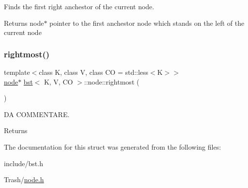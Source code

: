 Finds the first right anchestor of the current node. 

\begin{DoxyReturn}{Returns}
node$\ast$ pointer to the first anchestor node which stands on the left of the current node 
\end{DoxyReturn}
\mbox{\label{structbst_1_1node_ad76e8929422404ad9dd2459ccbc9ee7d}} 
\subsubsection{\texorpdfstring{rightmost()}{rightmost()}}
{\footnotesize\ttfamily template$<$class K, class V, class CO = std\+::less$<$\+K$>$$>$ \\
\hyperlink{structbst_1_1node}{node}$\ast$ \hyperlink{classbst}{bst}$<$ K, V, CO $>$\+::node\+::rightmost (\begin{DoxyParamCaption}{ }\end{DoxyParamCaption})\hspace{0.3cm}{\ttfamily [inline]}}



DA C\+O\+M\+M\+E\+N\+T\+A\+RE. 

\begin{DoxyReturn}{Returns}

\end{DoxyReturn}


The documentation for this struct was generated from the following files\+:\begin{DoxyCompactItemize}
\item 
include/bst.\+h\item 
Trash/\hyperlink{node_8h}{node.\+h}\end{DoxyCompactItemize}
